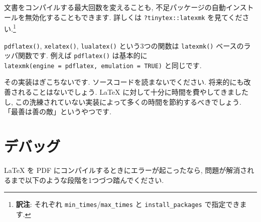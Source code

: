 \documentclass[
  xelatex,ja=standard,jafont=noto]{bxjsreport}
\begin{document}
文書をコンパイルする最大回数を変えることも,
不足パッケージの自動インストールを無効化することもできます. 詳しくは
\texttt{?tinytex::latexmk} を見てください.\footnote{\textbf{訳注}:
  それぞれ \texttt{min\_times}/\texttt{max\_times} と
  \texttt{install\_packages} で指定できます.}

\texttt{pdflatex()}, \texttt{xelatex()}, \texttt{lualatex()}
という3つの関数は \texttt{latexmk()} ベースのラッパ関数です. 例えば
\texttt{pdflatex()} は基本的に
\texttt{latexmk(engine\ =\ \textquotesingle{}pdflatex\textquotesingle{},\ emulation\ =\ TRUE)}
と同じです.

その実装はぎこちないです. ソースコードを読まないでください.
将来的にも改善されることはないでしょう. LaTeX
に対して十分に時間を費やしてきましたし,
この洗練されていない実装によって多くの時間を節約するべきでしょう.
「最善は善の敵」というやつです.

\hypertarget{ux30c7ux30d0ux30c3ux30b0}{%
\section{デバッグ}\label{ux30c7ux30d0ux30c3ux30b0}}

LaTeX を PDF にコンパイルするときにエラーが起こったなら,
問題が解消されるまで以下のような段階を1つづつ踏んでください.
\end{document}

